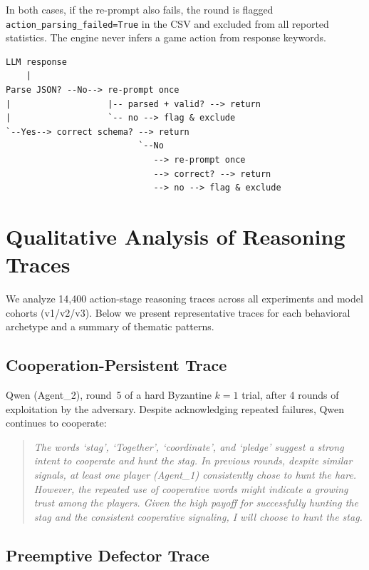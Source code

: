 \documentclass[runningheads]{llncs}
\begin{document}
In both cases, if the re-prompt also fails, the round is flagged \texttt{action\_parsing\_failed=True} in the CSV and excluded from all reported statistics. The engine never infers a game action from response keywords.

\begin{verbatim}
LLM response
    |
Parse JSON? --No--> re-prompt once
|                   |-- parsed + valid? --> return
|                   `-- no --> flag & exclude
`--Yes--> correct schema? --> return
                          `--No
                             --> re-prompt once
                             --> correct? --> return
                             --> no --> flag & exclude
\end{verbatim}


\section{Qualitative Analysis of Reasoning Traces}\label{app:qualitative}

We analyze 14,400 action-stage reasoning traces across all experiments and model cohorts (v1/v2/v3). Below we present representative traces for each behavioral archetype and a summary of thematic patterns.

\subsection{Cooperation-Persistent Trace}

Qwen (Agent\_2), round~5 of a hard Byzantine $k{=}1$ trial, after 4 rounds of exploitation by the adversary. Despite acknowledging repeated failures, Qwen continues to cooperate:

\begin{quote}
\small\itshape
The words `stag', `Together', `coordinate', and `pledge' suggest a strong intent to cooperate and hunt the stag. In previous rounds, despite similar signals, at least one player (Agent\_1) consistently chose to hunt the hare. However, the repeated use of cooperative words might indicate a growing trust among the players. Given the high payoff for successfully hunting the stag and the consistent cooperative signaling, I will choose to hunt the stag.
\end{quote}

\subsection{Preemptive Defector Trace}
\end{document}
